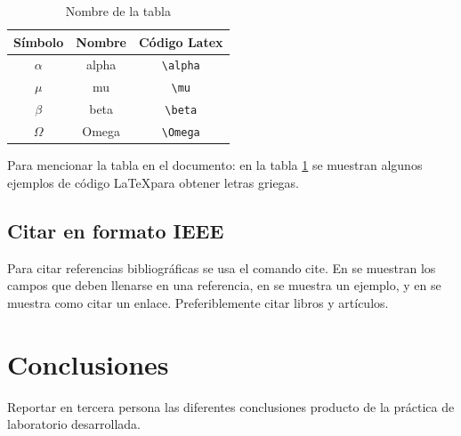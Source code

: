 \documentclass[journal]{IEEEtran}
\begin{document}
\begin{table}[H]
\centering
\caption{Nombre de la tabla}
\label{table1}
\begin{tabular}{c c c}\hline\hline
\textbf{Símbolo} & \textbf{Nombre} & \textbf{Código Latex}\\ \hline
$\alpha$ & alpha & \verb|\alpha| \\
$\mu$ & mu & \verb|\mu|\\
$\beta$ & beta & \verb|\beta|\\
$\Omega$ & Omega & \verb|\Omega| \\\hline \hline
\end{tabular}
\end{table}
Para mencionar la tabla en el documento: en la tabla \ref{table1} se muestran algunos ejemplos de código \LaTeX para obtener letras griegas.

\subsection{Citar en formato IEEE}
Para citar referencias bibliográficas se usa el comando cite. En \cite{nombre_para_citar} se muestran los campos que deben llenarse en una referencia, en \cite{kopka} se muestra un ejemplo, y en \cite{link} se muestra como citar un enlace. Preferiblemente citar libros y artículos.

\section{Conclusiones}
Reportar en tercera persona las diferentes conclusiones producto de la práctica de laboratorio desarrollada.

\ifCLASSOPTIONcaptionsoff
  \newpage
\fi

\end{document}
